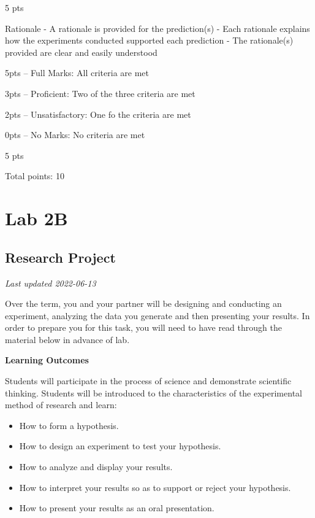 \documentclass[
]{book}
\providecommand{\tightlist}{%
  \setlength{\itemsep}{0pt}\setlength{\parskip}{0pt}}
\begin{document}
5 pts

Rationale
- A rationale is provided for the prediction(s)
- Each rationale explains how the experiments conducted supported each prediction
- The rationale(s) provided are clear and easily understood

5pts -- Full Marks: All criteria are met

3pts -- Proficient: Two of the three criteria are met

2pts -- Unsatisfactory: One fo the criteria are met

0pts -- No Marks: No criteria are met

5 pts

Total points: 10

\hypertarget{part-lab-2b}{%
\part*{Lab 2B}\label{part-lab-2b}}

\hypertarget{research-project}{%
\chapter*{Research Project}\label{research-project}}

\emph{Last updated 2022-06-13}

Over the term, you and your partner will be designing and conducting an experiment, analyzing the data you generate and then presenting your results. In order to prepare you for this task, you will need to have read through the material below in advance of lab.

\textbf{Learning Outcomes}

Students will participate in the process of science and demonstrate scientific thinking. Students will be introduced to the characteristics of the experimental method of research and learn:

\begin{itemize}
\tightlist
\item
  How to form a hypothesis.
\item
  How to design an experiment to test your hypothesis.
\item
  How to analyze and display your results.
\item
  How to interpret your results so as to support or reject your hypothesis.
\item
  How to present your results as an oral presentation.
\end{itemize}
\end{document}
